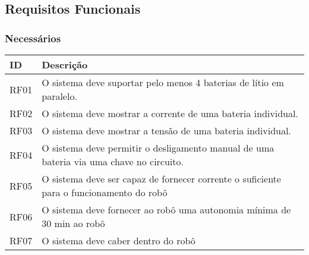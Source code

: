 \documentclass[12pt]{article}
\begin{document}
\pagebreak[4]

\subsection{Requisitos Funcionais}

\subsubsection{Necessários}

\begin{longtable}{|p{}|p{}|}
	\hline
	\textbf{ID} & \textbf{Descrição}                                                                      \\
	\hline
	RF01        & O sistema deve suportar pelo menos 4 baterias de lítio em paralelo.                     \\
	\hline
	RF02        & O sistema deve mostrar a corrente de uma bateria individual.                            \\
	\hline
	RF03        & O sistema deve mostrar a tensão de uma bateria individual.                              \\
	\hline
	RF04        & O sistema deve permitir o desligamento manual de uma bateria via uma chave no circuito. \\
	\hline
	RF05        & O sistema deve ser capaz de fornecer corrente o suficiente para o funcionamento do robô \\
	\hline
	RF06        & O sistema deve fornecer ao robô uma autonomia mínima de 30 min ao robô                  \\
	\hline
	RF07        & O sistema deve caber dentro do robô                                                     \\
	\hline
\end{longtable}
\end{document}
